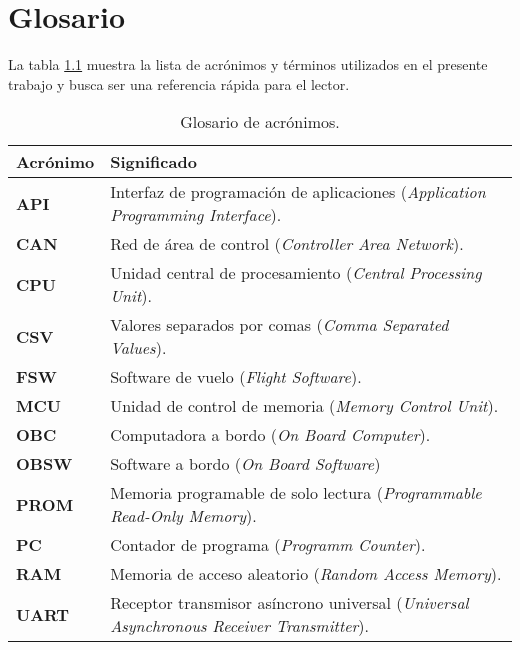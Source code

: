
\chapter{Glosario} %
\label{AppendixA} %

La tabla \ref{tab:glosario} muestra la lista de acrónimos y términos utilizados en el presente trabajo y busca ser una referencia rápida para el lector.


\begin{table}[h]
	\centering
	\caption[Tipos de emuladores]{Glosario de acrónimos.}
	\begin{tabular}{p{} p{}}
		\toprule
		\textbf{Acrónimo} & \textbf{Significado} \\
		\midrule
    \textbf{API} & Interfaz de programación de aplicaciones (\textit{Application Programming Interface}). \\
    \textbf{CAN} & Red de área de control (\textit{Controller Area Network}). \\
    \textbf{CPU} & Unidad central de procesamiento (\textit{Central Processing Unit}). \\
    \textbf{CSV} & Valores separados por comas (\textit{Comma Separated Values}). \\
    \textbf{FSW} & Software de vuelo (\textit{Flight Software}). \\
    \textbf{MCU} & Unidad de control de memoria (\textit{Memory Control Unit}). \\
    \textbf{OBC} & Computadora a bordo (\textit{On Board Computer}). \\
    \textbf{OBSW} & Software a bordo (\textit{On Board Software}) \\
    \textbf{PROM} & Memoria programable de solo lectura (\textit{Programmable Read-Only Memory}). \\
    \textbf{PC} & Contador de programa (\textit{Programm Counter}). \\
    \textbf{RAM} & Memoria de acceso aleatorio (\textit{Random Access Memory}). \\
    \textbf{UART} & Receptor transmisor asíncrono universal (\textit{Universal Asynchronous Receiver Transmitter}). \\
		\bottomrule
		\hline
	\end{tabular}
	\label{tab:glosario}
\end{table}
